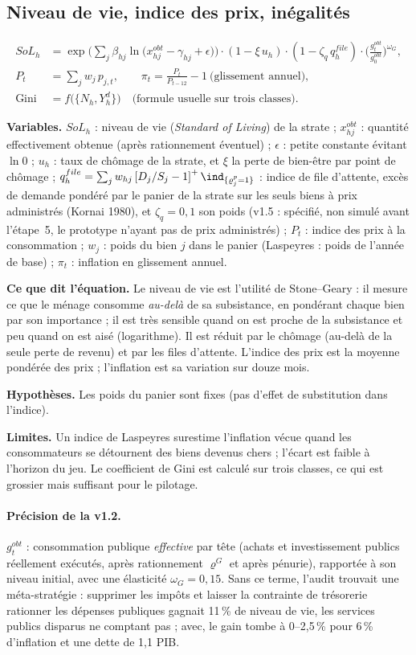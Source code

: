 \documentclass[11pt,a4paper]{article}
\newcommand{\variables}{\par\noindent\textbf{Variables.} }
\newcommand{\sens}{\par\noindent\textbf{Ce que dit l'équation.} }
\newcommand{\hyp}{\par\noindent\textbf{Hypothèses.} }
\newcommand{\limites}{\par\noindent\textbf{Limites.} }
\newcommand{\pos}[1]{{\left[#1\right]^{+}}}
\begin{document}
\subsection{Niveau de vie, indice des prix, inégalités}
\begin{align}
SoL_h &= \exp\Big(\sum_j \beta_{hj} \ln\big(x^{obt}_{hj} - \gamma_{hj} + \epsilon\big)\Big)\cdot(1 - \xi\, u_h)\cdot(1-\zeta_q\, q^{file}_h)\cdot\Big(\frac{g^{obt}_t}{g^{obt}_0}\Big)^{\omega_G}, \label{eq:sol}\\
P_t &= \sum_j w_j\, p_{j,t}, \qquad \pi_t = \frac{P_t}{P_{t-12}} - 1 \ \text{(glissement annuel)}, \label{eq:cpi}\\
\text{Gini} &= f\big(\{N_h, Y^d_h\}\big) \quad\text{(formule usuelle sur trois classes)}. 
\end{align}
\begin{lecture}
\variables $SoL_h$ : niveau de vie (\emph{Standard of Living}) de la strate ; $x^{obt}_{hj}$ : quantité effectivement obtenue (après rationnement éventuel) ; $\epsilon$ : petite constante évitant $\ln 0$ ; $u_h$ : taux de chômage de la strate, et $\xi$ la perte de bien-être par point de chômage ; $q^{file}_h = \sum_j w_{hj}\,\pos{D_j/S_j-1}\,\ind_{\{\varrho^p_j=1\}}$ : indice de file d'attente, excès de demande pondéré par le panier de la strate sur les seuls biens à prix administrés (Kornai 1980), et $\zeta_q=0{,}1$ son poids (v1.5 : spécifié, non simulé avant l'étape~5, le prototype n'ayant pas de prix administrés) ; $P_t$ : indice des prix à la consommation ; $w_j$ : poids du bien $j$ dans le panier (Laspeyres : poids de l'année de base) ; $\pi_t$ : inflation en glissement annuel.
\sens Le niveau de vie est l'utilité de Stone--Geary : il mesure ce que le ménage consomme \emph{au-delà} de sa subsistance, en pondérant chaque bien par son importance ; il est très sensible quand on est proche de la subsistance et peu quand on est aisé (logarithme). Il est réduit par le chômage (au-delà de la seule perte de revenu) et par les files d'attente. L'indice des prix est la moyenne pondérée des prix ; l'inflation est sa variation sur douze mois.
\hyp Les poids du panier sont fixes (pas d'effet de substitution dans l'indice).
\limites Un indice de Laspeyres surestime l'inflation vécue quand les consommateurs se détournent des biens devenus chers ; l'écart est faible à l'horizon du jeu. Le coefficient de Gini est calculé sur trois classes, ce qui est grossier mais suffisant pour le pilotage.
\paragraph{Précision de la v1.2.} $g^{obt}_t$ : consommation publique \emph{effective} par tête (achats et investissement publics réellement exécutés, après rationnement $\varrho^G$ et après pénurie), rapportée à son niveau initial, avec une élasticité $\omega_G=0{,}15$. Sans ce terme, l'audit trouvait une méta-stratégie : supprimer les impôts et laisser la contrainte de trésorerie rationner les dépenses publiques gagnait 11\,\% de niveau de vie, les services publics disparus ne comptant pas ; avec, le gain tombe à 0--2,5\,\% pour 6\,\% d'inflation et une dette de 1,1 PIB.
\end{lecture}
\end{document}
